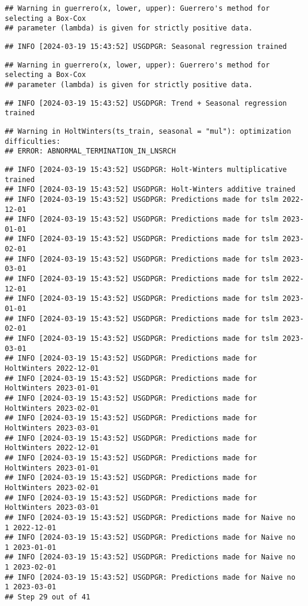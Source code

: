 \documentclass[
]{article}
\begin{document}
\begin{verbatim}
## Warning in guerrero(x, lower, upper): Guerrero's method for selecting a Box-Cox
## parameter (lambda) is given for strictly positive data.
\end{verbatim}

\begin{verbatim}
## INFO [2024-03-19 15:43:52] USGDPGR: Seasonal regression trained
\end{verbatim}

\begin{verbatim}
## Warning in guerrero(x, lower, upper): Guerrero's method for selecting a Box-Cox
## parameter (lambda) is given for strictly positive data.
\end{verbatim}

\begin{verbatim}
## INFO [2024-03-19 15:43:52] USGDPGR: Trend + Seasonal regression trained
\end{verbatim}

\begin{verbatim}
## Warning in HoltWinters(ts_train, seasonal = "mul"): optimization difficulties:
## ERROR: ABNORMAL_TERMINATION_IN_LNSRCH
\end{verbatim}

\begin{verbatim}
## INFO [2024-03-19 15:43:52] USGDPGR: Holt-Winters multiplicative trained
## INFO [2024-03-19 15:43:52] USGDPGR: Holt-Winters additive trained
## INFO [2024-03-19 15:43:52] USGDPGR: Predictions made for tslm 2022-12-01
## INFO [2024-03-19 15:43:52] USGDPGR: Predictions made for tslm 2023-01-01
## INFO [2024-03-19 15:43:52] USGDPGR: Predictions made for tslm 2023-02-01
## INFO [2024-03-19 15:43:52] USGDPGR: Predictions made for tslm 2023-03-01
## INFO [2024-03-19 15:43:52] USGDPGR: Predictions made for tslm 2022-12-01
## INFO [2024-03-19 15:43:52] USGDPGR: Predictions made for tslm 2023-01-01
## INFO [2024-03-19 15:43:52] USGDPGR: Predictions made for tslm 2023-02-01
## INFO [2024-03-19 15:43:52] USGDPGR: Predictions made for tslm 2023-03-01
## INFO [2024-03-19 15:43:52] USGDPGR: Predictions made for HoltWinters 2022-12-01
## INFO [2024-03-19 15:43:52] USGDPGR: Predictions made for HoltWinters 2023-01-01
## INFO [2024-03-19 15:43:52] USGDPGR: Predictions made for HoltWinters 2023-02-01
## INFO [2024-03-19 15:43:52] USGDPGR: Predictions made for HoltWinters 2023-03-01
## INFO [2024-03-19 15:43:52] USGDPGR: Predictions made for HoltWinters 2022-12-01
## INFO [2024-03-19 15:43:52] USGDPGR: Predictions made for HoltWinters 2023-01-01
## INFO [2024-03-19 15:43:52] USGDPGR: Predictions made for HoltWinters 2023-02-01
## INFO [2024-03-19 15:43:52] USGDPGR: Predictions made for HoltWinters 2023-03-01
## INFO [2024-03-19 15:43:52] USGDPGR: Predictions made for Naive no  1 2022-12-01
## INFO [2024-03-19 15:43:52] USGDPGR: Predictions made for Naive no  1 2023-01-01
## INFO [2024-03-19 15:43:52] USGDPGR: Predictions made for Naive no  1 2023-02-01
## INFO [2024-03-19 15:43:52] USGDPGR: Predictions made for Naive no  1 2023-03-01
## Step 29 out of 41
\end{verbatim}
\end{document}
